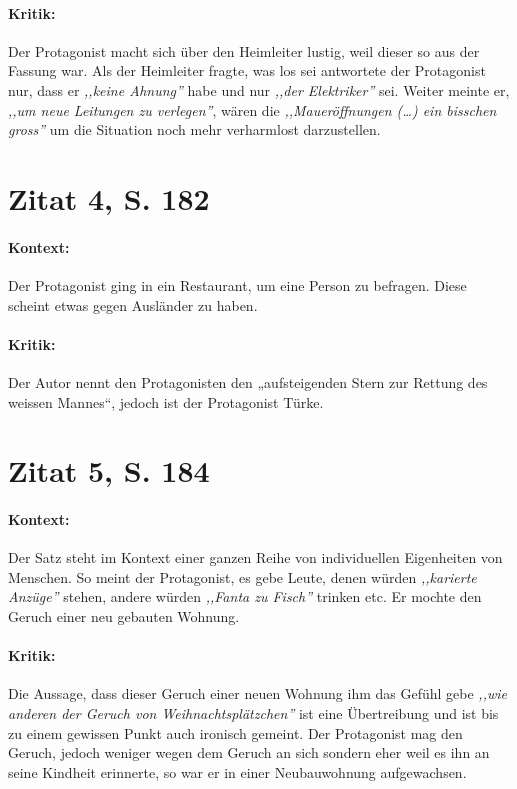 \documentclass[12pt,twoside,a4paper]{article}
\begin{document}
	\paragraph{Kritik:} Der Protagonist macht sich über den Heimleiter lustig, weil dieser so aus der Fassung war. Als der Heimleiter fragte, was los sei antwortete der Protagonist nur, dass er \textit{,,keine Ahnung''} habe und nur \textit{,,der Elektriker''} sei. Weiter meinte er, \textit{,,um neue Leitungen zu verlegen''}, wären die \textit{,,Maueröffnungen (\dots) ein bisschen gross''} um die Situation noch mehr verharmlost darzustellen.
	
	\section{Zitat 4, S. 182}
	
	\paragraph{Kontext:} Der Protagonist ging in ein Restaurant, um eine Person zu befragen. Diese scheint etwas gegen Ausländer zu haben. 
	
	
	\paragraph{Kritik:} Der Autor  nennt den Protagonisten den „aufsteigenden Stern zur Rettung des weissen Mannes“, jedoch ist der Protagonist Türke.
	
		

	\section{Zitat 5, S. 184}
	
	\paragraph{Kontext:} Der Satz steht im Kontext einer ganzen Reihe von individuellen Eigenheiten von Menschen. So meint der Protagonist, es gebe Leute, denen würden \textit{,,karierte Anzüge''} stehen, andere würden \textit{,,Fanta zu Fisch''} trinken etc. Er mochte den Geruch einer neu gebauten Wohnung.
	
	\paragraph{Kritik:} Die Aussage, dass dieser Geruch einer neuen Wohnung ihm das Gefühl gebe \textit{,,wie anderen der Geruch von Weihnachtsplätzchen''} ist eine Übertreibung und ist bis zu einem gewissen Punkt auch ironisch gemeint. Der Protagonist mag den Geruch, jedoch weniger wegen dem Geruch an sich sondern eher weil es ihn an seine Kindheit erinnerte, so war er in einer Neubauwohnung aufgewachsen.
	
\end{document}
